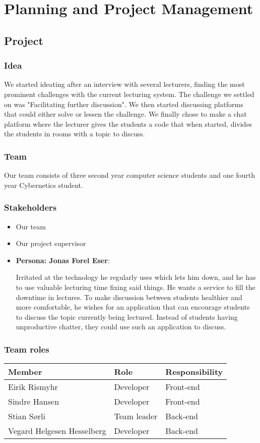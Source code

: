 \section {Planning and Project Management}
\subsection{Project}
\subsubsection{Idea}
We started ideating after an interview with several lecturers, finding the most prominent challenges with the current lecturing system. The challenge we settled on was "Facilitating further discussion". We then started discussing platforms that could either solve or lessen the challenge. We finally chose to make a chat platform where the lecturer gives the students a code that when started, divides the students in rooms with a topic to discuss. 

\subsubsection{Team}
Our team consists of three second year computer science students and one fourth year Cybernetics student. 

\subsubsection{Stakeholders}
\begin{itemize}
    \item Our team
    \item Our project supervisor
    \item \textbf{Persona: Jonas Forel Eser}:
    
    Irritated at the technology he regularly uses which lets him down, and he has to use valuable lecturing time fixing said things. He wants a service to fill the downtime in lectures. 
    To make discussion between students healthier and more comfortable, he wishes for an application that can encourage students to discuss the topic currently being lectured. Instead of students having unproductive chatter, they could use such an application to discuss.
\end{itemize}

\subsubsection{Team roles}
\begin{adjustbox}{center}
\begin{tabular}{ l | l | l}
    Member & Role & Responsibility \\ \hline
    Eirik Rismyhr & Developer & Front-end\\ 
    Sindre Hansen & Developer & Front-end \\ 
    Stian Sørli & Team leader & Back-end\\ 
    Vegard Helgesen Hesselberg & Developer & Back-end\\ 
\end{tabular}
\end{adjustbox}

